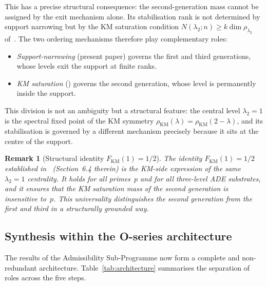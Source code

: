 \documentclass[11pt,a4paper]{article}
\newtheorem{remark}[theorem]{Remark}
\newcommand{\FKM}{F_{\mathrm{KM}}}
\begin{document}
      This has a precise structural consequence: the second-generation mass
      cannot be assigned by the exit mechanism alone.
      Its stabilisation rank is not determined by support narrowing but
      by the KM saturation condition $N(\lambda_2; n) \geq k\dim\rho_{\lambda_2}$
      of~\cite{Beau2026a5}.
      The two ordering mechanisms therefore play complementary roles:
      \begin{itemize}[nosep]
  \item \emph{Support-narrowing} (present paper) governs the first and third
  generations, whose levels exit the support at finite ranks.
  \item \emph{KM saturation} (\cite{Beau2026a5}) governs the second
  generation, whose level is permanently inside the support.
      \end{itemize}
      This division is not an ambiguity but a structural feature: the central level
      $\lambda_2 = 1$ is the spectral fixed point of the KM symmetry
      $\rho_{\mathrm{KM}}(\lambda) = \rho_{\mathrm{KM}}(2-\lambda)$,
      and its stabilisation is governed by a different mechanism
      precisely because it sits at the centre of the support.

      \begin{remark}[Structural identity $\FKM(1) = 1/2$]
        \label{rem:FKM-half}
        The identity $\FKM(1) = 1/2$ established in~\cite{Beau2026a5}
        (Section~6.4 therein) is the KM-side expression of the same
        $\lambda_2 = 1$ centrality.
        It holds for all primes~$p$ and for all three-level ADE substrates,
        and it ensures that the KM saturation mass of the second generation
        is insensitive to~$p$.
        This universality distinguishes the second generation from the first
        and third in a structurally grounded way.
      \end{remark}

    \subsection{Synthesis within the O-series architecture}
      \label{subsec:synthesis}

      The results of the Admissibility Sub-Programme now form a complete
      and non-redundant architecture.
      Table~\ref{tab:architecture} summarises the separation of roles
      across the five steps.
\end{document}
